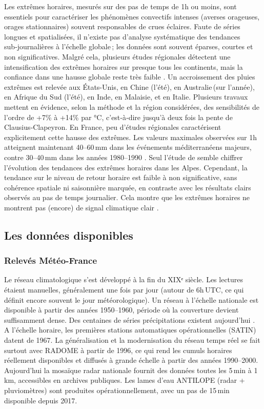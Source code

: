 \documentclass[
  article,
  nofooter,
  noheadings]{jss}
\begin{document}
Les extrêmes horaires, mesurés sur des pas de temps de 1h ou moins, sont
essentiels pour caractériser les phénomènes convectifs intenses (averses
orageuses, orages stationnaires) souvent responsables de crues éclaires.
Faute de séries longues et spatialisées, il n'existe pas d'analyse
systématique des tendances sub‑journalières à l'échelle globale\,; les
données sont souvent éparses, courtes et non significatives. Malgré
cela, plusieurs études régionales détectent une intensification des
extrêmes horaires sur presque tous les continents, mais la confiance
dans une hausse globale reste très faible \citep{IPCC2021}. Un
accroissement des pluies extrêmes est relevée aux États-Unis, en Chine
(l'été), en Australie\,(sur l'année), en Afrique du Sud (l'été), en
Inde, en Malaisie, et en Italie. Plusieurs travaux mettent en évidence,
selon la méthode et la région considérées, des sensibilités de l'ordre
de +7\% à +14\% par °C, c'est‑à‑dire jusqu'à deux fois la pente de
Clausius‑Clapeyron. En France, peu d'études régionales caractérisent
explicitement cette hausse des extrêmes. Les valeurs maximales observées
sur 1h atteignent maintenant 40--60\,mm dans les événements
méditerranéens majeurs, contre 30--40\,mm dans les années 1980--1990
\citep{meteofrance2024_episodesMediterraneens}. Seul l'étude de
\citet{Berghald2025} semble chiffrer l'évolution des tendances des
extrêmes horaires dans les Alpes. Cependant, la tendance sur le niveau
de retour horaire est faible à non significative, sans cohérence
spatiale ni saisonnière marquée, en contraste avec les résultats clairs
observés au pas de temps journalier. Cela montre que les extrêmes
horaires ne montrent pas (encore) de signal climatique clair
\citep{Soubeyroux01022015}.

\subsection{Les données disponibles}\label{les-donnuxe9es-disponibles}

\subsubsection{Relevés
Météo-France}\label{relevuxe9s-muxe9tuxe9o-france}

Le réseau climatologique s'est développé à la fin du XIXᵉ siècle. Les
lectures étaient manuelles, généralement une fois par jour (autour de
6h\,UTC, ce qui définit encore souvent le jour météorologique). Un
réseau à l'échelle nationale est disponible à partir des années
1950--1960, période où la couverture devient suffisamment dense. Des
centaines de séries précipitations existent aujourd'hui
\citep{meteo-france_2020_breve_observation_classique}. A l'échelle
horaire, les premières stations automatiques opérationnelles (SATIN)
datent de 1967. La généralisation et la modernisation du réseau temps
réel se fait surtout avec RADOME à partir de 1996, ce qui rend les
cumuls horaires réellement disponibles et diffusés à grande échelle à
partir des années 1990--2000. Aujourd'hui la mosaïque radar nationale
fournit des données toutes les 5\,min à 1\,km, accessibles en archives
publiques. Les lames d'eau ANTILOPE (radar + pluviomètres) sont
produites opérationnellement, avec un pas de 15\,min disponible depuis
2017.
\end{document}
